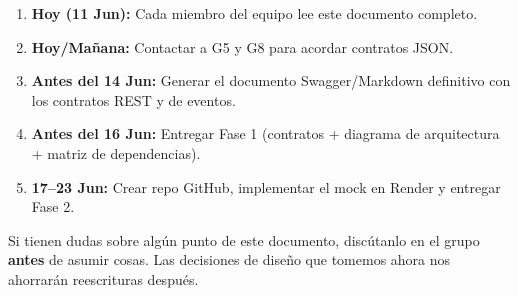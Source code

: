 \documentclass[11pt, a4paper]{article}
\begin{document}
\begin{enumerate}[label=\textbf{\arabic*.}]
  \item \textbf{Hoy (11 Jun):} Cada miembro del equipo lee este documento
        completo.
  \item \textbf{Hoy/Mañana:} Contactar a G5 y G8 para acordar contratos
        JSON.
  \item \textbf{Antes del 14 Jun:} Generar el documento Swagger/Markdown
        definitivo con los contratos REST y de eventos.
  \item \textbf{Antes del 16 Jun:} Entregar Fase 1 (contratos + diagrama
        de arquitectura + matriz de dependencias).
  \item \textbf{17--23 Jun:} Crear repo GitHub, implementar el mock en
        Render y entregar Fase 2.
\end{enumerate}

\begin{tipbox}
  Si tienen dudas sobre algún punto de este documento, discútanlo en el
  grupo \textbf{antes} de asumir cosas. Las decisiones de diseño que
  tomemos ahora nos ahorrarán reescrituras después.
\end{tipbox}
\end{document}
